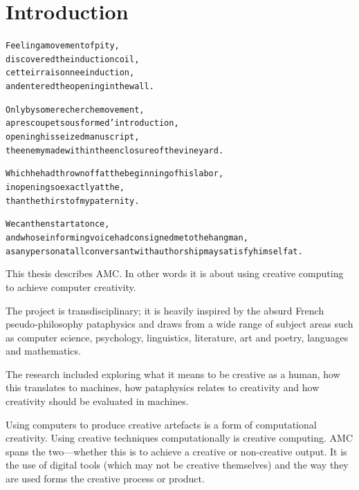 
\chapter{Introduction}
\label{ch:introduction}

\startcontents[chapters]

\vfill

\begin{alltt}\sffamily
Feeling a movement of pity,
discovered the induction coil,
cette irraisonnee induction,
and entered the opening in the wall.

Only by some recherche movement,
apres coup et sous forme d'introduction,
opening his seized manuscript,
the enemy made within the enclosure of the vineyard.

Which he had thrown off at the beginning of his labor,
in opening so exactly at the,
than the thirst of my paternity.

We can then start at once,
and whose informing voice had consigned me to the hangman,
as any person at all conversant with authorship may satisfy himself at.
\end{alltt}

\newpage
\minicontents
\spirals

\begin{figure}[!htbp]
\centering
  \def\svgwidth{\textwidth}
  
\end{figure}


This thesis describes \acf{AMC}. In other words it is about using creative computing to achieve computer creativity.

The project is transdisciplinary; it is heavily inspired by the absurd French pseudo-philosophy pataphysics and draws from a wide range of subject areas such as computer science, psychology, linguistics, literature, art and poetry, languages and mathematics.

The research included exploring what it means to be creative as a human, how this translates to machines, how pataphysics relates to creativity and how creativity should be evaluated in machines.

Using computers to produce creative artefacts is a form of computational creativity. Using creative techniques computationally is creative computing. \ac{AMC} spans the two---whether this is to achieve a creative or non-creative output. It is the use of digital tools (which may not be creative themselves) and the way they are used forms the creative process or product. 

